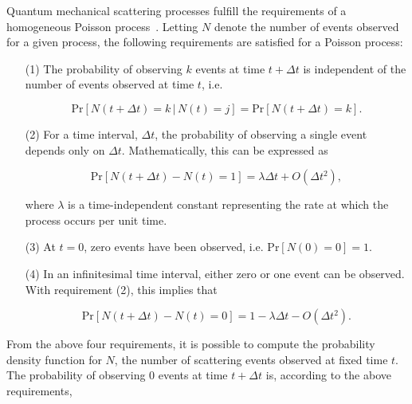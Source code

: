 
Quantum mechanical scattering processes fulfill the requirements of a
homogeneous Poisson process~\cite{bib:Cassandras:2006:IDE:1205892}. Letting $N$ denote the number of
events observed for a given process, the following requirements are
satisfied for a Poisson process:

\begin{enumerate}[nolistsep]
\item[(1)] The probability of observing $k$ events at time $t + \Delta{t}$ is
  independent of the number of events observed at time $t$, i.e.

\begin{equation}
\textrm{Pr}\left [N(t + \Delta{t})=k\,|\,N(t) = j\right] = \textrm{Pr}\left[N(t +
  \Delta{t})=k\right].
\end{equation}

\item[(2)] For a time interval, $\Delta{t}$, the
  probability of observing a single event depends only on
  $\Delta{t}$. Mathematically, this can be expressed as

\begin{equation}
\textrm{Pr}\left[N(t + \Delta{t}) - N(t) = 1\right] = \lambda\Delta{t} + O(\Delta{t}^2),
\end{equation}

where $\lambda$ is a time-independent constant representing the rate at
which the process occurs per unit time. 

\item[(3)] At $t = 0$, zero events have been observed,
  i.e. $\textrm{Pr}\left[N(0) = 0\right] = 1$.

\item[(4)] In an infinitesimal time interval, either zero or one event
can be observed. With requirement (2), this implies that

\begin{equation}
\textrm{Pr}\left[N(t + \Delta{t}) - N(t) = 0\right] = 1 - \lambda\Delta{t} - O(\Delta{t}^2).
\end{equation}

\end{enumerate}

\noindent
From the above four requirements, it is possible to compute the probability
density function for $N$, the number of scattering events observed at
fixed time $t$. The probability of observing 0 events at time
$t+\Delta{t}$ is, according to the above requirements,


